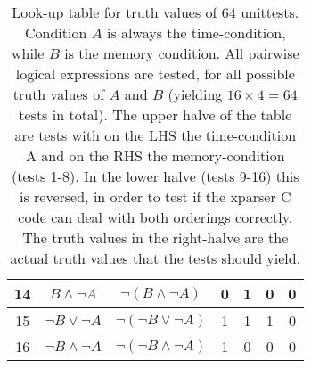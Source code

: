\documentclass[11pt,a4paper]{article}
\begin{document}
\begin{table}[Hb!]
\begin{tabular}{|c|c|c||cccc|}
\hline 
14 & $B \land \neg A$ & $\neg(B \land \neg A)$ & 0 & 1 & 0 & 0\\  
\hline 
15 & $\neg B \lor \neg A$ & $\neg(\neg B \lor \neg A)$ & 1 & 1 & 1 & 0\\  
\hline 
16 & $\neg B \land \neg A$ & $\neg(\neg B \land \neg A)$ & 1 & 0 & 0 & 0\\  
\hline 
\end{tabular}
\caption{Look-up table for truth values of $64$ unittests. Condition $A$ is always the time-condition, while $B$ is the memory condition. All pairwise logical expressions are tested, for all possible truth values of $A$ and $B$ (yielding $16\times 4=64$ tests in total). The upper halve of the table are tests with on the LHS the time-condition A and on the RHS the memory-condition (tests 1-8). In the lower halve (tests 9-16) this is reversed, in order to test if the xparser C code can deal with both orderings correctly. The truth values in the right-halve are the actual truth values that the tests should yield.}
\end{table}
\end{document}
